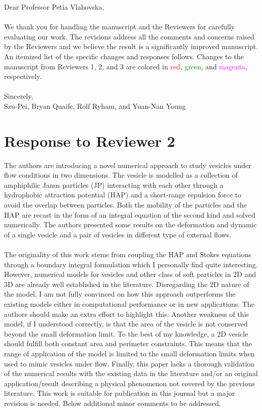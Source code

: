 \documentclass[11pt]{article}
\newcommand{\comment}[1]{{\color{blue} #1}}
\begin{document}
\noindent
Dear Professor Petia Vlahovska,
\\ \\
\noindent
We thank you for handling the manuscript and the
Reviewers for carefully evaluating our work. 
The revisions address all the comments and concerns
raised by the Reviewers 
and we believe the result is a significantly improved manuscript.
An itemized list of the specific changes and responses follows.
Changes to the manuscript from Reviewers 1, 2, and 3 are colored in \textcolor{red}{red},
\textcolor{green}{green}, and \textcolor{magenta}{magenta},
respectively. \\ \\
\noindent
Sincerely,
\\
\noindent
Szu-Pei, Bryan Quaife, Rolf Ryham, and Yuan-Nan Young

\section*{Response to Reviewer 2}
\comment{
\noindent
The authors are introducing a novel numerical approach to study vesicles
under flow conditions in two dimensions. The vesicle is modelled as a
collection of amphiphilic Janus particles (JP) interacting with each
other through a hydrophobic attraction potential (HAP) and a short-range
repulsion force to avoid the overlap between particles. Both the
mobility of the particles and the HAP are recast in the form of an
integral equation of the second kind and solved numerically. The authors
presented some results on the deformation and dynamic of a single
vesicle and a pair of vesicles in different type of external flows.
\\ \\
\noindent
The originality of this work stems from coupling the HAP and Stokes
equations through a boundary integral formulation which I personally
find quite interesting. However, numerical models for vesicles and other
class of soft particles in 2D and 3D are already well established in the
literature. Disregarding the 2D nature of the model, I am not fully
convinced on how this approach outperforms the existing models either in
computational performance or in new applications. The authors should
make an extra effort to highlight this. Another weakness of this model,
if I understood correctly, is that the area of the vesicle is not
conserved beyond the small deformation limit. To the best of my
knowledge, a 2D vesicle should fulfill both constant area and perimeter
constraints. This means that the range of application of the model is
limited to the small deformation limits when used to mimic vesicles
under flow. Finally, this paper lacks a thorough validation of the
numerical results with the existing data in the literature and/or an
original application/result describing a physical phenomenon not covered
by the previous literature. This work is suitable for publication in
this journal but a major revision is needed. Below additional minor
comments to be addressed.}
\end{document}
